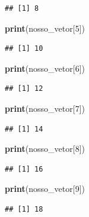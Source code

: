 \documentclass[
]{book}
\newenvironment{Shaded}{\begin{snugshade}}{\end{snugshade}}
\newcommand{\DecValTok}[1]{\textcolor[rgb]{0.00,0.00,0.81}{#1}}
\newcommand{\KeywordTok}[1]{\textcolor[rgb]{0.13,0.29,0.53}{\textbf{#1}}}
\newcommand{\NormalTok}[1]{#1}
\begin{document}
\begin{verbatim}
## [1] 8
\end{verbatim}

\begin{Shaded}
\begin{Highlighting}[]
\KeywordTok{print}\NormalTok{(nosso_vetor[}\DecValTok{5}\NormalTok{])}
\end{Highlighting}
\end{Shaded}

\begin{verbatim}
## [1] 10
\end{verbatim}

\begin{Shaded}
\begin{Highlighting}[]
\KeywordTok{print}\NormalTok{(nosso_vetor[}\DecValTok{6}\NormalTok{])}
\end{Highlighting}
\end{Shaded}

\begin{verbatim}
## [1] 12
\end{verbatim}

\begin{Shaded}
\begin{Highlighting}[]
\KeywordTok{print}\NormalTok{(nosso_vetor[}\DecValTok{7}\NormalTok{])}
\end{Highlighting}
\end{Shaded}

\begin{verbatim}
## [1] 14
\end{verbatim}

\begin{Shaded}
\begin{Highlighting}[]
\KeywordTok{print}\NormalTok{(nosso_vetor[}\DecValTok{8}\NormalTok{])}
\end{Highlighting}
\end{Shaded}

\begin{verbatim}
## [1] 16
\end{verbatim}

\begin{Shaded}
\begin{Highlighting}[]
\KeywordTok{print}\NormalTok{(nosso_vetor[}\DecValTok{9}\NormalTok{])}
\end{Highlighting}
\end{Shaded}

\begin{verbatim}
## [1] 18
\end{verbatim}
\end{document}

